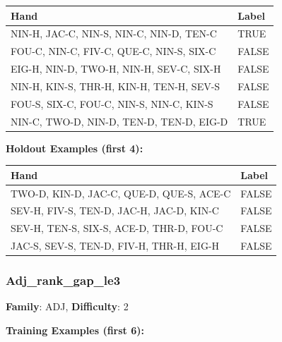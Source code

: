 \documentclass[10pt,a4paper]{article}
\begin{document}
\begin{small}
\begin{tabular}{p{8cm}l}
\toprule
Hand & Label \\
\midrule
NIN-H, JAC-C, NIN-S, NIN-C, NIN-D, TEN-C & \textcolor{positive}{TRUE} \\
FOU-C, NIN-C, FIV-C, QUE-C, NIN-S, SIX-C & \textcolor{negative}{FALSE} \\
EIG-H, NIN-D, TWO-H, NIN-H, SEV-C, SIX-H & \textcolor{negative}{FALSE} \\
NIN-H, KIN-S, THR-H, KIN-H, TEN-H, SEV-S & \textcolor{negative}{FALSE} \\
FOU-S, SIX-C, FOU-C, NIN-S, NIN-C, KIN-S & \textcolor{negative}{FALSE} \\
NIN-C, TWO-D, NIN-D, TEN-D, TEN-D, EIG-D & \textcolor{positive}{TRUE} \\
\bottomrule
\end{tabular}
\end{small}

\textbf{Holdout Examples (first 4):}

\begin{small}
\begin{tabular}{p{8cm}l}
\toprule
Hand & Label \\
\midrule
TWO-D, KIN-D, JAC-C, QUE-D, QUE-S, ACE-C & \textcolor{negative}{FALSE} \\
SEV-H, FIV-S, TEN-D, JAC-H, JAC-D, KIN-C & \textcolor{negative}{FALSE} \\
SEV-H, TEN-S, SIX-S, ACE-D, THR-D, FOU-C & \textcolor{negative}{FALSE} \\
JAC-S, SEV-S, TEN-D, FIV-H, THR-H, EIG-H & \textcolor{negative}{FALSE} \\
\bottomrule
\end{tabular}
\end{small}

\vspace{0.5cm}

\subsubsection{Adj\_rank\_gap\_le3}

\textbf{Family}: ADJ, \textbf{Difficulty}: 2

\textbf{Training Examples (first 6):}
\end{document}
